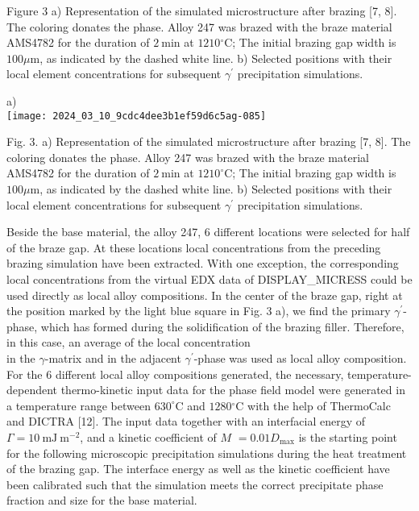 \documentclass[10pt]{article}
\begin{document}
Figure 3 a) Representation of the simulated microstructure after brazing [7, 8]. The coloring donates the phase. Alloy 247 was brazed with the braze material AMS4782 for the duration of $2 \mathrm{~min}$ at $1210{ }^{\circ} \mathrm{C}$; The initial brazing gap width is $100 \mu \mathrm{m}$, as indicated by the dashed white line. b) Selected positions with their local element concentrations for subsequent $\gamma^{\prime}$ precipitation simulations.

a)\\
\texttt{[image: 2024\_03\_10\_9cdc4dee3b1ef59d6c5ag-085]}

Fig. 3. a) Representation of the simulated microstructure after brazing [7, 8]. The coloring donates the phase. Alloy 247 was brazed with the braze material AMS4782 for the duration of $2 \mathrm{~min}$ at $1210^{\circ} \mathrm{C}$; The initial brazing gap width is $100 \mu \mathrm{m}$, as indicated by the dashed white line. b) Selected positions with their local element concentrations for subsequent $\gamma^{\prime}$ precipitation simulations.

Beside the base material, the alloy 247, 6 different locations were selected for half of the braze gap. At these locations local concentrations from the preceding brazing simulation have been extracted. With one exception, the corresponding local concentrations from the virtual EDX data of DISPLAY\_MICRESS could be used directly as local alloy compositions. In the center of the braze gap, right at the position marked by the light blue square in Fig. 3 a), we find the primary $\gamma^{\prime}$-phase, which has formed during the solidification of the brazing filler. Therefore, in this case, an average of the local concentration\\
in the $\gamma$-matrix and in the adjacent $\gamma^{\prime}$-phase was used as local alloy composition. For the 6 different local alloy compositions generated, the necessary, temperature-dependent thermo-kinetic input data for the phase field model were generated in a temperature range between $630^{\circ} \mathrm{C}$ and $1280{ }^{\circ} \mathrm{C}$ with the help of ThermoCalc and DICTRA [12]. The input data together with an interfacial energy of $\Gamma=10 \mathrm{~mJ} \mathrm{~m}^{-2}$, and a kinetic coefficient of $M$ $=0.01 D_{\max }$ is the starting point for the following microscopic precipitation simulations during the heat treatment of the brazing gap. The interface energy as well as the kinetic coefficient have been calibrated such that the simulation meets the correct precipitate phase fraction and size for the base material.
\end{document}
